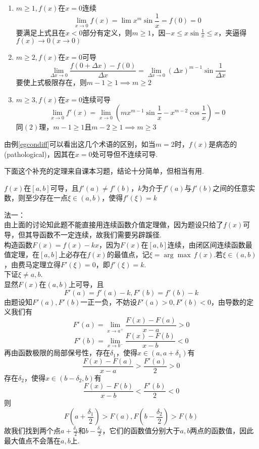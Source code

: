 \begin{analysis}
\begin{enumerate}
	\item $m\geq 1,f(x)$在$x=0$连续
	\[\lim_{x\to 0}f(x)=\lim x^m\sin\frac{1}{x}=f(0)=0\]
	要满足上式且在$x<0$部分有定义，则$m\geq 1$，因$-x\leq x\sin\frac{1}{x}\leq x$，夹逼得$f(x)\to 0(x\to 0)$
	\item $m\geq 2,f(x)$在$x=0$可导
	\[\lim_{\Delta x\to 0}\frac{f(0+\Delta x)-f(0)}{\Delta x}=\lim_{\Delta x\to 0}(\Delta x)^{m-1}\sin\frac{1}{\Delta x}\]
	要使上式极限存在，则$m-1\geq 1\implies m\geq 2$
	\item $m\geq 3,f(x)$在$x=0$连续可导
	\[\lim_{x\to 0}f'(x)=\lim_{x\to 0}(mx^{m-1}\sin\frac{1}{x}-x^{m-2}\cos\frac{1}{x})=0\]
	同$(2)$理，$m-1\geq 1$且$m-2\geq 1\implies m\geq 3$
\end{enumerate}
\end{analysis}
由例\ref{egcondiff}可以看出这几个术语的区别，如当$m=2$时，$f(x)$是病态的(pathological)，因其在$x=0$处可导但不连续可导.
\par 下面这个补充的定理来自课本习题，结论十分简单，但相当有用.
\begin{theorem}[达布(Darboux)定理]
$f(x)$在$[a,b]$可导，且$f'(a)\neq f'(b)$，$k$为介于$f'(a)$与$f'(b)$之间的任意实数，则至少存在一点$\xi\in(a,b)$，使得$f'(\xi)=k$
\end{theorem}
\begin{analysis}
法一：\\
由上面的讨论知此题不能直接用连续函数介值定理做，因为题设只给了$f(x)$可导，但其导函数不一定连续，故我们需要另辟蹊径.\\
构造函数$F(x)=f(x)-kx$，因为$F(x)$在$[a,b]$连续，由闭区间连续函数最值定理，在$[a,b]$上必存在$f(x)$的最值点，记$\xi=\arg\max\,f(x)$.若$\xi\in(a,b)$，由费马定理立得$F'(\xi)=0$，即$f'(\xi)=k$.\\
下证$\xi\ne a,b$.\\
显然$F(x)$在$(a,b)$上可导，且
\[F'(a)=f'(a)-k,F'(b)=f'(b)-k\]
由题设知$F'(a),F'(b)$一正一负，不妨设$F'(a)>0,F'(b)<0$，由导数的定义我们有
\[F'(a)=\lim_{x\to a^+}\frac{F(x)-F(a)}{x-a}>0\]
\[F'(b)=\lim_{x\to b^-}\frac{F(x)-F(b)}{x-b}<0\]
再由函数极限的局部保号性，存在$\delta_1$，使得$x\in(a,a+\delta_1)$有
\[\frac{F(x)-F(a)}{x-a}>\frac{F'(a)}{2}>0\]
存在$\delta_2$，使得$x\in(b-\delta_2,b)$有
\[\frac{F(x)-F(b)}{x-b}<\frac{F'(b)}{2}<0\]
则
\[F(a+\frac{\delta_1}{2})>F(a),F(b-\frac{\delta_2}{2})>F(b)\]
故我们找到两个点$\displaystyle a+\frac{\delta_1}{2}$和$\displaystyle b-\frac{\delta_2}{2}$，它们的函数值分别大于$a,b$两点的函数值，因此最大值点不会落在$a,b$上.
\end{analysis}

